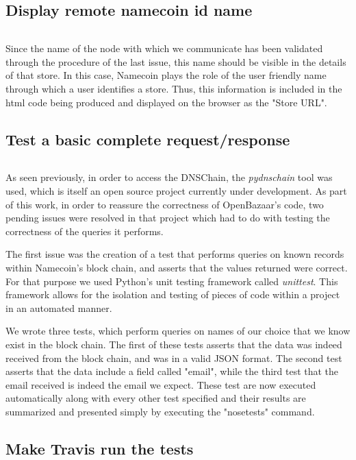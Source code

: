 \documentclass[journal]{IEEEtran}
\newcommand{\code}[2]{
    \inputminted[fontsize=\scriptsize, frame=single, linenos=false]{#1}{#2}
}
\begin{document}
\code{python}{codes/transport.py}
\code{python}{codes/trust.py}


\subsection{Display remote namecoin id name}
\code{html}{codes/us.html}

Since the name of the node with which we communicate has been validated through the procedure
of the last issue, this name should be visible in the details of that store. In this case,
Namecoin plays the role of the user friendly name through which a user identifies a store.
Thus, this information is included in the html code being produced and displayed on the
browser as the "Store URL".

\subsection{Test a basic complete request/response}
\code{python}{codes/test_server.py}

As seen previously, in order to access the DNSChain, the \textit{pydnschain} tool was used, which is
itself an open source project currently under development. As part of this work, in order
to reassure the correctness of OpenBazaar's code, two pending issues were resolved in
that project which had to do with testing the correctness of the queries it performs.

The first issue was the creation of a test that performs queries on known records within
Namecoin's block chain, and asserts that the values returned were correct.
For that purpose we used Python's unit testing framework called \textit{unittest}. This
framework allows for the isolation and testing of pieces of code within
a project in an automated manner.

We wrote three tests, which perform queries on names of our choice that we know exist in
the block chain. The first of these tests asserts that the data was indeed received from
the block chain, and was in a valid JSON format. The second test asserts that the data
include a field called "email", while the third test that the email received is indeed
the email we expect. These test are now executed automatically along with every other
test specified and their results are summarized and presented simply by executing the 
"nosetests" command.

\subsection{Make Travis run the tests}
\code{yaml}{codes/travis.yml}
\end{document}
